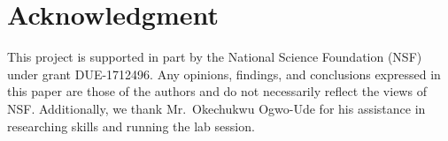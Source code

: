 \documentclass{article}
\begin{document}
\section*{Acknowledgment}

This project is supported in part by the National Science Foundation (NSF) under grant DUE-1712496. Any opinions, findings, and conclusions expressed in this paper are those of the authors and do not necessarily reflect the views of NSF. Additionally, we thank Mr.~Okechukwu Ogwo-Ude for his assistance in researching skills and  running the lab session.

\medskip

\small{

}
\end{document}
